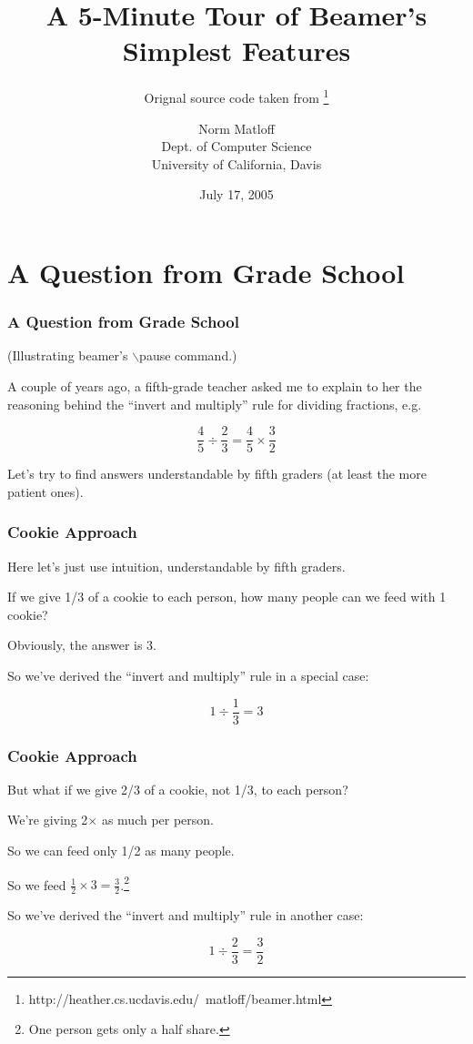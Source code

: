 \documentclass{beamer}
\title{A 5-Minute Tour of Beamer's Simplest Features}
\subtitle{Orignal source code taken from \footnote{http://heather.cs.ucdavis.edu/~matloff/beamer.html}}
\author{Norm Matloff \\
    Dept. of Computer Science \\
    University of California, Davis 
}
\date{July 17, 2005}
\begin{document}
\begin{frame}
\titlepage
\end{frame}

\section{A Question from Grade School}

\begin{frame}
\frametitle{A Question from Grade School}

(Illustrating {\sc beamer}'s $\backslash$pause command.)
\vskip 0.5in

A couple of years ago, a fifth-grade teacher asked me to explain to her
the reasoning behind the ``invert and multiply'' rule for dividing
fractions, e.g.
\pause  %

$$
\frac{4}{5} \div \frac{2}{3} = \frac{4}{5} \times \frac{3}{2}
$$

\pause

Let's try to find answers understandable by fifth graders (at least the
more patient ones).

\end{frame}

\begin{frame}
\frametitle{Cookie Approach}

Here let's just use intuition, understandable by fifth graders.

\pause

If we give 1/3 of a cookie to each person, how many people can we
feed with 1 cookie?  

\pause

Obviously, the answer is 3.

So we've derived the ``invert and multiply'' rule in a special case:

$$
1 \div \frac{1}{3} = 3
$$

\end{frame}

\begin{frame}
\frametitle{Cookie Approach}

But what if we give 2/3 of a cookie, not 1/3, to each person?  

We're giving 2$\times$ as much per person. 

So we can feed only 1/2 as many people. 

So we feed  $\frac{1}{2} \times 3 = \frac{3}{2}$.\footnote{One person
gets only a half share.}

So we've derived the ``invert and multiply'' rule in another case:

$$
1 \div \frac{2}{3} = \frac{3}{2}
$$

\end{frame}
\end{document}
